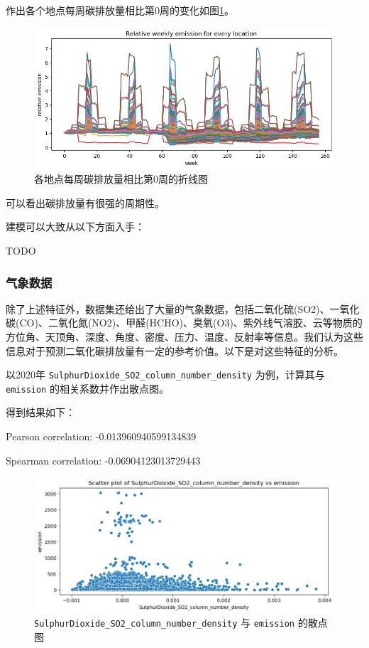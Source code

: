 \documentclass{ctexart}
\begin{document}
作出各个地点每周碳排放量相比第0周的变化如图\ref{fig:6}。

\begin{figure}[H]
      \centering
      \includegraphics[width=1\textwidth]{output6.png}
      \caption{\label{fig:6}各地点每周碳排放量相比第0周的折线图}
\end{figure}

可以看出碳排放量有很强的周期性。

建模可以大致从以下方面入手：

TODO

\subsubsection{气象数据}

除了上述特征外，数据集还给出了大量的气象数据，包括二氧化硫(SO2)、一氧化碳(CO)、二氧化氮(NO2)、甲醛(HCHO)、臭氧(O3)、紫外线气溶胶、云等物质的方位角、天顶角、深度、角度、密度、压力、温度、反射率等信息。我们认为这些信息对于预测二氧化碳排放量有一定的参考价值。以下是对这些特征的分析。

以2020年 \texttt{SulphurDioxide\_SO2\_column\_number\_density} 为例，计算其与 \texttt{emission} 的相关系数并作出散点图。

得到结果如下：

\begin{center}
Pearson correlation: -0.013960940599134839

Spearman correlation: -0.06904123013729443
\end{center}


\begin{figure}[H]
      \centering
      \includegraphics[width=1\textwidth]{output1.png}
      \caption{\label{fig:1}\texttt{SulphurDioxide\_SO2\_column\_number\_density} 与 \texttt{emission} 的散点图}
\end{figure}
\end{document}
